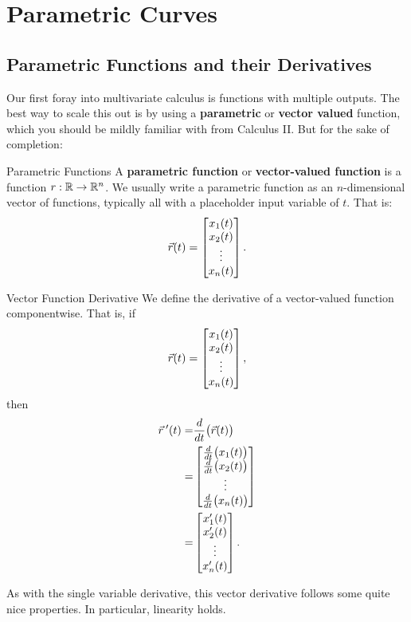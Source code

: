 \section{Parametric Curves}
\hypertarget{paraderiv}{\subsection{Parametric Functions and their Derivatives}}

Our first foray into multivariate calculus is functions with multiple outputs. The best way to scale this out is by using a \textbf{parametric} or \textbf{vector valued} function, which you should be mildly familiar with from Calculus II. But for the sake of completion:

\begin{definition}{Parametric Functions}
A \textbf{parametric function} or \textbf{vector-valued function} is a function $r:\mathbb{R}\to\mathbb{R}^n$. We usually write a parametric function as an $n$-dimensional vector of functions, typically all with a placeholder input variable of $t$. That is: $$\vec{r}(t)=\begin{bmatrix}x_1(t)\\x_2(t)\\ \vdots \\ x_n(t)\end{bmatrix}.$$

\end{definition}

\begin{definition}{Vector Function Derivative}
We define the derivative of a vector-valued function componentwise. That is, if $$\vec{r}(t)=\begin{bmatrix}x_1(t)\\x_2(t)\\ \vdots \\ x_n(t)\end{bmatrix},$$
then
\begin{align*}
\vec{r}\hspace{0.2em}'(t)=&\frac{d}{dt}\big(\vec{r}(t)\big)\\
=&\begin{bmatrix}\frac{d}{dt}\big(x_1(t)\big)\\\frac{d}{dt}\big(x_2(t)\big)\\ \vdots \\ \frac{d}{dt}\big(x_n(t)\big)\end{bmatrix}\\
=&\begin{bmatrix}x_1'(t)\\x_2'(t)\\ \vdots \\ x_n'(t)\end{bmatrix}.
\end{align*}
\end{definition}

As with the single variable derivative, this vector derivative follows some quite nice properties. In particular, linearity holds.

